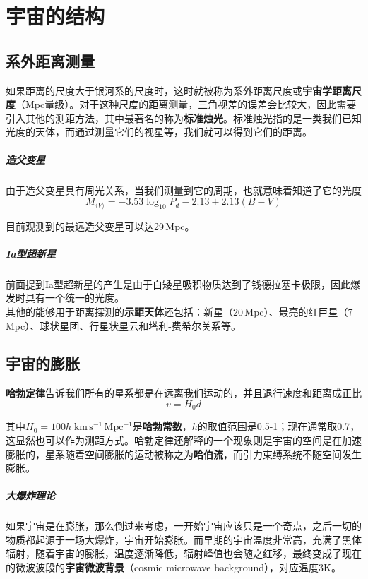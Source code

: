 \chapter{宇宙的结构}
\section{系外距离测量}
如果距离的尺度大于银河系的尺度时，这时就被称为系外距离尺度或\textbf{宇宙学距离尺度}（Mpc量级）。对于这种尺度的距离测量，三角视差的误差会比较大，因此需要引入其他的测距方法，其中最著名的称为\textbf{标准烛光}。标准烛光指的是一类我们已知光度的天体，而通过测量它们的视星等，我们就可以得到它们的距离。

\paragraph{造父变星}
由于造父变星具有周光关系，当我们测量到它的周期，也就意味着知道了它的光度
\begin{equation}
  M_{\langle V\rangle}=-3.53\log_{10}P_d-2.13+2.13(B-V)
\end{equation}

目前观测到的最远造父变星可以达29\,Mpc。

\paragraph{Ia型超新星}
前面提到Ia型超新星的产生是由于白矮星吸积物质达到了钱德拉塞卡极限，因此爆发时具有一个统一的光度。\mbox{}\\

其他的能够用于距离探测的\textbf{示距天体}还包括：新星（20\,Mpc）、最亮的红巨星（7\,Mpc）、球状星团、行星状星云和塔利-费希尔关系等。

\section{宇宙的膨胀}
\textbf{哈勃定律}告诉我们所有的星系都是在远离我们运动的，并且退行速度和距离成正比
\begin{equation}
  v=H_0d
\end{equation}

其中$H_0=100h\;\mathrm{km\,s^{-1}\,Mpc^{-1}}$是\textbf{哈勃常数}，$h$的取值范围是0.5-1；现在通常取0.7，这显然也可以作为测距方式。哈勃定律还解释的一个现象则是宇宙的空间是在加速膨胀的，星系随着空间膨胀的运动被称之为\textbf{哈伯流}，而引力束缚系统不随空间发生膨胀。

\paragraph{大爆炸理论}
如果宇宙是在膨胀，那么倒过来考虑，一开始宇宙应该只是一个奇点，之后一切的物质都起源于一场大爆炸，宇宙开始膨胀。而早期的宇宙温度非常高，充满了黑体辐射，随着宇宙的膨胀，温度逐渐降低，辐射峰值也会随之红移，最终变成了现在的微波波段的\textbf{宇宙微波背景}（cosmic microwave background），对应温度3\;K。